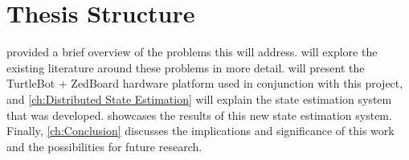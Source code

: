 \documentclass[thesis.tex]{subfile}
\begin{document}
\section{Thesis Structure} %
 provided a brief overview of the problems this will address.  will explore the existing literature around these problems in more detail.  will present the TurtleBot + ZedBoard hardware platform used in conjunction with this project, and \cref{ch:Distributed State Estimation} will explain the state estimation system that was developed.  showcases the results of this new state estimation system. Finally, \cref{ch:Conclusion} discusses the implications and significance of this work and the possibilities for future research.
\end{document}
